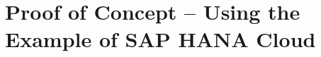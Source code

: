\chapter{Proof of Concept -- Using the Example of SAP HANA Cloud}\label{ch:poc}

\begin{comment}

	GOV 0.6
	TS 0.5
	AS 0.4
	CVP_ITS 0.04
	CVP_ISV 0.05
	CVP_AC 0.01 oder 0.02
	CVP_SI 0.03
	CVP_PC 0.07
	PoAaC_ITS 0.01
	PoAaC_ISV 0.01
	PoAaC_AC 0.02
	PoAaC_SI 0.025
	PoAaC_PC 0.025
	
	Senior Researcher
		expert in 
			a) PaaS development 
			b) Innovation and network theorie

\end{comment}